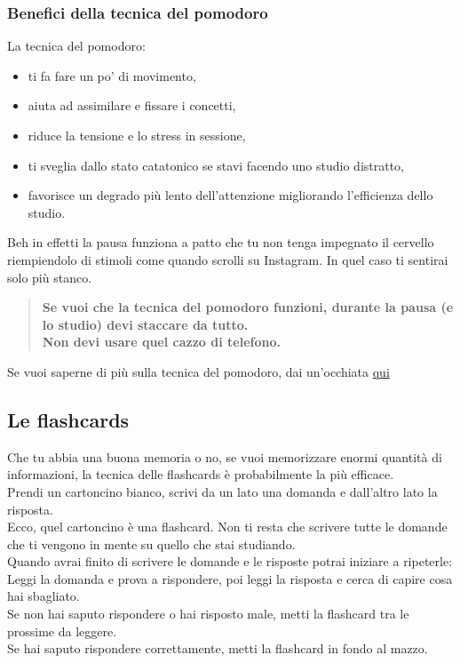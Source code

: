 \documentclass{article}
\begin{document}
\subsubsection{Benefici della tecnica del pomodoro}
La tecnica del pomodoro:
\begin{itemize}
\item ti fa fare un po' di movimento,
\item aiuta ad assimilare e fissare i concetti,
\item riduce la tensione e lo stress in sessione,
\item ti sveglia dallo stato catatonico se stavi facendo uno studio distratto,
\item favorisce un degrado più lento dell'attenzione migliorando l'efficienza dello studio.
\end{itemize}
Beh in effetti la pausa funziona a patto che tu non tenga impegnato il cervello riempiendolo di stimoli come quando scrolli su Instagram. In quel caso ti sentirai solo più stanco.
\begin{quote}
\textbf{Se vuoi che la tecnica del pomodoro funzioni, durante la pausa (e lo studio) devi staccare da tutto.\\
Non devi usare quel cazzo di telefono.}
\end{quote}
Se vuoi saperne di più sulla tecnica del pomodoro, dai un'occhiata \href{https://it.wikipedia.org/wiki/Tecnica_del_pomodoro}{qui}


\subsection{Le flashcards}
Che tu abbia una buona memoria o no, se vuoi memorizzare enormi quantità di informazioni, la tecnica delle flashcards è probabilmente la più efficace.\\
Prendi un cartoncino bianco, scrivi da un lato una domanda e dall'altro lato la risposta.\\
Ecco, quel cartoncino è una flashcard. Non ti resta che scrivere tutte le domande che ti vengono in mente su quello che stai studiando.\\
Quando avrai finito di scrivere le domande e le risposte potrai iniziare a ripeterle:\\
Leggi la domanda e prova a rispondere, poi leggi la risposta e cerca di capire cosa hai sbagliato.\\
Se non hai saputo rispondere o hai risposto male, metti la flashcard tra le prossime da leggere.\\
Se hai saputo rispondere correttamente, metti la flashcard in fondo al mazzo.\\
\end{document}

